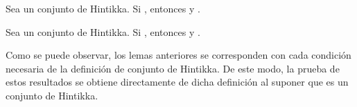 \begin{isabellebody}
\begin{isamarkuptext}
  \begin{lema}
    Sea  un conjunto de Hintikka. Si , entonces 
     y .
  \end{lema}

  \begin{lema}
    Sea  un conjunto de Hintikka. Si , entonces 
     y .
  \end{lema}

  Como se puede observar, los lemas anteriores se corresponden con 
  cada condición necesaria de la definición de conjunto de Hintikka. 
  De este modo, la prueba de estos resultados se obtiene directamente 
  de dicha definición al suponer que  es un conjunto de Hintikka.


\end{isamarkuptext}
\end{isabellebody}
